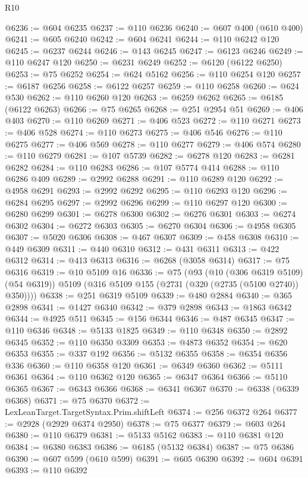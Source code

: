 \begin{lexlean}{R10}
\begin{coremodule}
@6236 := @604 @6235
@6237 := @110 @6236
@6240 := @607 @400 (@610 @400)
@6241 := @605 @6240
@6242 := @604 @6241
@6244 := @110 @6242 @120
@6245 := @6237 @6244
@6246 := @143 @6245
@6247 := @6123 @6246
@6249 := @110 @6247 @120
@6250 := @6231 @6249
@6252 := @6120 (@6122 @6250)
@6253 := @75 @6252
@6254 := @624 @5162
@6256 := @110 @6254 @120
@6257 := @6187 @6256
@6258 := @6122 @6257
@6259 := @110 @6258
@6260 := @624 @530
@6262 := @110 @6260 @120
@6263 := @6259 @6262
@6265 := @6185 (@6122 @6263)
@6266 := @75 @6265
@6268 := @251 @2954 @51
@6269 := @406 @403
@6270 := @110 @6269
@6271 := @406 @523
@6272 := @110 @6271
@6273 := @406 @528
@6274 := @110 @6273
@6275 := @406 @546
@6276 := @110 @6275
@6277 := @406 @569
@6278 := @110 @6277
@6279 := @406 @574
@6280 := @110 @6279
@6281 := @107 @5739
@6282 := @6278 @120
@6283 := @6281 @6282
@6284 := @110 @6283
@6286 := @107 @5774 @414
@6288 := @110 @6286 @409
@6289 := @2992 @6288
@6291 := @110 @6289 @120
@6292 := @4958 @6291
@6293 := @2992 @6292
@6295 := @110 @6293 @120
@6296 := @6284 @6295
@6297 := @2992 @6296
@6299 := @110 @6297 @120
@6300 := @6280 @6299
@6301 := @6278 @6300
@6302 := @6276 @6301
@6303 := @6274 @6302
@6304 := @6272 @6303
@6305 := @6270 @6304
@6306 := @4958 @6305
@6307 := @5020 @6306
@6308 := @467 @6307
@6309 := @458 @6308
@6310 := @449 @6309
@6311 := @440 @6310
@6312 := @431 @6311
@6313 := @422 @6312
@6314 := @413 @6313
@6316 := @6268 (@3058 @6314)
@6317 := @75 @6316
@6319 := @10 @5109 @16
@6336 := @75
    (@93
      (@10 (@306 @6319 @5109) (@54 @6319))
      @5109
      (@316 @5109 @155 (@2731 (@320 (@2735 (@5100 @2740)) @350))))
@6338 := @251 @6319 @5109
@6339 := @480 @2884
@6340 := @365 @2898
@6341 := @1427 @6340
@6342 := @379 @2898
@6343 := @1863 @6342
@6344 := @4925 @511
@6345 := @156 @6344
@6346 := @487 @6345
@6347 := @110 @6346
@6348 := @5133 @1825
@6349 := @110 @6348
@6350 := @2892 @6345
@6352 := @110 @6350 @3309
@6353 := @4873 @6352
@6354 := @620 @6353
@6355 := @337 @192
@6356 := @5132 @6355
@6358 := @6354 @6356 @336
@6360 := @110 @6358 @120
@6361 := @6349 @6360
@6362 := @5111 @6361
@6364 := @110 @6362 @120
@6365 := @6347 @6364
@6366 := @5110 @6365
@6367 := @6343 @6366
@6368 := @6341 @6367
@6370 := @6338 (@6339 @6368)
@6371 := @75 @6370
@6372 := LexLeanTarget.TargetSyntax.Prim.shiftLeft
@6374 := @256 @6372 @264
@6377 := @2928 (@2929 @6374 @2950)
@6378 := @75 @6377
@6379 := @603 @264
@6380 := @110 @6379
@6381 := @5133 @5162
@6383 := @110 @6381 @120
@6384 := @6380 @6383
@6386 := @6185 (@5132 @6384)
@6387 := @75 @6386
@6390 := @607 @599 (@610 @599)
@6391 := @605 @6390
@6392 := @604 @6391
@6393 := @110 @6392

\end{coremodule}
\end{lexlean}

